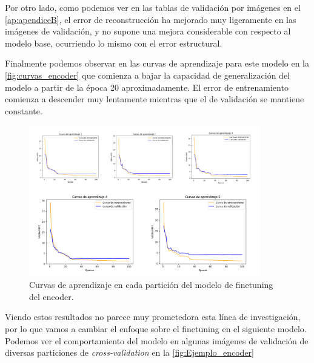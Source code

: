     \medskip
    
    \noindent Por otro lado, como podemos ver en las tablas de validación por imágenes en el \autoref{ap:apendiceB}, el error de reconstrucción ha mejorado muy ligeramente en las imágenes de validación, y no supone una mejora considerable con respecto al modelo base, ocurriendo lo mismo con el error estructural.

    \medskip

    \noindent Finalmente podemos observar en las curvas de aprendizaje para este modelo en la \autoref{fig:curvas_encoder} que comienza a bajar la capacidad de generalización del modelo a partir de la época 20 aproximadamente. El error de entrenamiento comienza a descender muy lentamente mientras que el de validación se mantiene constante.

    \begin{figure}[!h]
        \centering
        \includegraphics[width=0.9\textwidth]{img/curvas_encoder.png}
        \caption{Curvas de aprendizaje en cada partición del modelo de finetuning del encoder.}
        \label{fig:curvas_encoder}
    \end{figure}

    \medskip

    \noindent Viendo estos resultados no parece muy prometedora esta línea de investigación, por lo que vamos a cambiar el enfoque sobre el finetuning en el siguiente modelo. Podemos ver el comportamiento del modelo en algunas imágenes de validación de diversas particiones de \textit{cross-validation} en la \autoref{fig:Ejemplo_encoder}

